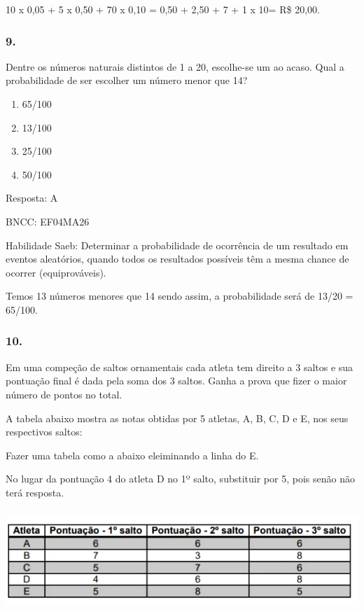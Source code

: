 10 x 0,05 + 5 x 0,50 + 70 x 0,10 = 0,50 + 2,50 + 7 + 1 x 10= R\$ 20,00.

\subsubsection{9.}\label{section-195}

Dentre os números naturais distintos de 1 a 20, escolhe-se um ao acaso.
Qual a probabilidade de ser escolher um número menor que 14?

\begin{enumerate}
\def\labelenumi{\alph{enumi})}
\item
  65/100
\item
  13/100
\item
  25/100
\item
  50/100
\end{enumerate}

Resposta: A

BNCC: EF04MA26

Habilidade Saeb: Determinar a probabilidade de ocorrência de um
resultado em eventos aleatórios, quando todos os resultados possíveis
têm a mesma chance de ocorrer (equiprováveis).

Temos 13 números menores que 14 sendo assim, a probabilidade será de
13/20 = 65/100.

\subsubsection{10.}\label{section-196}

Em uma compeção de saltos ornamentais cada atleta tem direito a 3 saltos
e sua pontuação final é dada pela soma dos 3 saltos. Ganha a prova que
fizer o maior número de pontos no total.

A tabela abaixo mostra as notas obtidas por 5 atletas, A, B, C, D e E,
nos seus respectivos saltos:

Fazer uma tabela como a abaixo eleiminando a linha do E.

No lugar da pontuação 4 do atleta D no 1º salto, substituir por 5, pois
senão não terá resposta.

\includegraphics[width=5.90556in,height=1.52431in]{media/image169.png}

